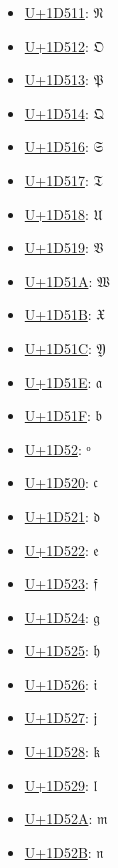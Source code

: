\begin{itemize}
	\item \href{https://decodeunicode.org/en/u+1D511}{U+1D511}: 𝔑
	\item \href{https://decodeunicode.org/en/u+1D512}{U+1D512}: 𝔒
	\item \href{https://decodeunicode.org/en/u+1D513}{U+1D513}: 𝔓
	\item \href{https://decodeunicode.org/en/u+1D514}{U+1D514}: 𝔔
	\item \href{https://decodeunicode.org/en/u+1D516}{U+1D516}: 𝔖
	\item \href{https://decodeunicode.org/en/u+1D517}{U+1D517}: 𝔗
	\item \href{https://decodeunicode.org/en/u+1D518}{U+1D518}: 𝔘
	\item \href{https://decodeunicode.org/en/u+1D519}{U+1D519}: 𝔙
	\item \href{https://decodeunicode.org/en/u+1D51A}{U+1D51A}: 𝔚
	\item \href{https://decodeunicode.org/en/u+1D51B}{U+1D51B}: 𝔛
	\item \href{https://decodeunicode.org/en/u+1D51C}{U+1D51C}: 𝔜
	\item \href{https://decodeunicode.org/en/u+1D51E}{U+1D51E}: 𝔞
	\item \href{https://decodeunicode.org/en/u+1D51F}{U+1D51F}: 𝔟
	\item \href{https://decodeunicode.org/en/u+1D52}{U+1D52}: ᵒ
	\item \href{https://decodeunicode.org/en/u+1D520}{U+1D520}: 𝔠
	\item \href{https://decodeunicode.org/en/u+1D521}{U+1D521}: 𝔡
	\item \href{https://decodeunicode.org/en/u+1D522}{U+1D522}: 𝔢
	\item \href{https://decodeunicode.org/en/u+1D523}{U+1D523}: 𝔣
	\item \href{https://decodeunicode.org/en/u+1D524}{U+1D524}: 𝔤
	\item \href{https://decodeunicode.org/en/u+1D525}{U+1D525}: 𝔥
	\item \href{https://decodeunicode.org/en/u+1D526}{U+1D526}: 𝔦
	\item \href{https://decodeunicode.org/en/u+1D527}{U+1D527}: 𝔧
	\item \href{https://decodeunicode.org/en/u+1D528}{U+1D528}: 𝔨
	\item \href{https://decodeunicode.org/en/u+1D529}{U+1D529}: 𝔩
	\item \href{https://decodeunicode.org/en/u+1D52A}{U+1D52A}: 𝔪
	\item \href{https://decodeunicode.org/en/u+1D52B}{U+1D52B}: 𝔫

\end{itemize}
